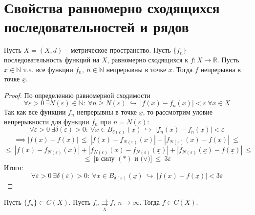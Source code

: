 \documentclass[11pt]{article}
\begin{document}
\section{Свойства равномерно сходящихся последовательностей и рядов}

\begin{lemma}
    Пусть $X = (X, d)$ -- метрическое пространство. Пусть $\{f_n\}$ -- 
    последовательность функций на $X$, равномерно сходящихся к $f \colon 
    X \to \mathbb{R}$. Пусть $\underline{x} \in \mathbb{N}$ т.ч. все 
    функции $f_n, \ n \in \mathbb{N}$ непрерывны в точке $\underline{x}$. 
    Тогда $f$ непрерывна в точке $\underline{x}$. 
\end{lemma}

\begin{proof}
    По определению равномерной сходимости 
    \[\forall \varepsilon > 0 \ \exists N(\varepsilon) \in \mathbb{N}: 
    \ \forall n \geq N(\varepsilon) \ \hookrightarrow \ \left\lvert f(x) 
    - f_n(x) \right\rvert < \varepsilon \ \forall x \in X \tag{$\ast$}\]
    Так как все функции $f_n$ непрерывны в точке $\underline{x}$, то 
    рассмотрим уловие непрерывности для функции $f_n$ при $n = 
    N(\varepsilon)$:
    \[\forall \varepsilon > 0 \ \exists \delta(\varepsilon) > 0: \ 
    \forall x \in B_{\delta(\varepsilon)}(\underline{x}) \ \hookrightarrow 
    \ \left\lvert f_n(x) - f_n(\underline{x}) \right\rvert < \varepsilon 
    \tag{$\vee$}\] \[\]
    \[\implies \left\lvert f(x) - f(\underline{x}) \right\rvert \ \leq \ 
    \left\lvert f(x) - f_{N(\varepsilon)}(x) \right\rvert + \left\lvert 
    f_{N(\varepsilon)}(x) - f(\underline{x}) \right\rvert \ \leq\]
    \[\leq \ \left\lvert f(x) - f_{N(\varepsilon)}(x) \right\rvert + 
    \left\lvert f_{N(\varepsilon)}(x) - f_{N(\varepsilon)}(\underline{x}) 
    \right\rvert + \left\lvert f_{N(\varepsilon)}(\underline{x}) - 
    f(\underline{x}) \right\rvert \ \leq\]
    \[\leq \ \text{[в силу $(\ast)$ и $(\vee$)]} \ \leq \ 3\varepsilon\]
    Итого:
    \[\forall \varepsilon > 0 \ \exists \delta(\varepsilon) > 0: \ 
    \forall x \in B_{\delta(\varepsilon)}(\underline{x}) \ \hookrightarrow 
    \ \left\lvert f(x) - f(\underline{x}) \right\rvert < 3\varepsilon\]
\end{proof}

\begin{lemma}
    Пусть $\{f_n\} \subset C(X)$. Пусть $f_n \underset{X}
    {\rightrightarrows} f, \ n \to \infty$. Тогда $f \in C(X)$.
\end{lemma}
\end{document}
